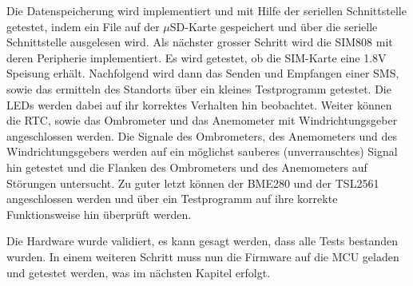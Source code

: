 Die Datenspeicherung wird implementiert und mit Hilfe der seriellen Schnittstelle getestet, indem ein File auf der $\mu$SD-Karte gespeichert und über die serielle Schnittstelle ausgelesen wird.
Als nächster grosser Schritt wird die SIM808 mit deren Peripherie implementiert. Es wird getestet, ob die SIM-Karte eine 1.8V Speisung erhält. Nachfolgend wird dann das Senden und Empfangen einer SMS, sowie das ermitteln des Standorts über ein kleines Testprogramm getestet. Die LEDs werden dabei auf ihr korrektes Verhalten hin beobachtet. 
Weiter können die RTC, sowie das Ombrometer und das Anemometer mit Windrichtungsgeber angeschlossen werden. Die Signale des Ombrometers, des Anemometers und des Windrichtungsgebers werden auf ein möglichst sauberes (unverrauschtes) Signal hin getestet und die Flanken des Ombrometers und des Anemometers auf Störungen untersucht.
Zu guter letzt können der BME280 und der TSL2561 angeschlossen werden und über ein Testprogramm auf ihre korrekte Funktionsweise hin überprüft werden.

Die Hardware wurde validiert, es kann gesagt werden, dass alle Tests bestanden wurden. In einem weiteren Schritt muss nun die Firmware auf die MCU geladen und getestet werden, was im nächsten Kapitel erfolgt.



